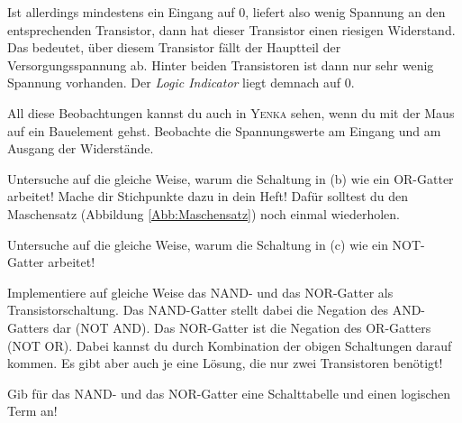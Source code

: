 Ist allerdings mindestens ein Eingang auf 0, liefert also wenig Spannung an den entsprechenden Transistor, dann hat dieser Transistor einen riesigen Widerstand.
Das bedeutet, über diesem Transistor fällt der Hauptteil der Versorgungsspannung ab.
Hinter beiden Transistoren ist dann nur sehr wenig Spannung vorhanden.
Der \emph{Logic Indicator} liegt demnach auf 0.

All diese Beobachtungen kannst du auch in \textsc{Yenka} sehen, wenn du mit der Maus auf ein Bauelement gehst. Beobachte die Spannungswerte am Eingang und am Ausgang der Widerstände.


\begin{Aufgabe} \label{Aufg:OrMasche}
Untersuche auf die gleiche Weise, warum die Schaltung in (b) wie ein OR-Gatter arbeitet! Mache dir Stichpunkte dazu in dein Heft! Dafür solltest du den Maschensatz (Abbildung \ref{Abb:Maschensatz}) noch einmal wiederholen.
\end{Aufgabe}

\begin{Zusatzaufgabe}
Untersuche auf die gleiche Weise, warum die Schaltung in (c) wie ein NOT-Gatter arbeitet!
\end{Zusatzaufgabe}

\begin{Aufgabe} \label{Aufg:NANDNORTransistor}
Implementiere auf gleiche Weise das NAND- und das NOR-Gatter als Transistorschaltung. Das NAND-Gatter stellt dabei die Negation des AND-Gatters dar (NOT AND). Das NOR-Gatter ist die Negation des OR-Gatters (NOT OR). Dabei kannst du durch Kombination der obigen Schaltungen darauf kommen. Es gibt aber auch je eine Lösung, die nur zwei Transistoren benötigt!
\end{Aufgabe}

\begin{Aufgabe} \label{Aufg:NANDNORTerm}
Gib für das NAND- und das NOR-Gatter eine Schalttabelle und einen logischen Term an!
\end{Aufgabe}




